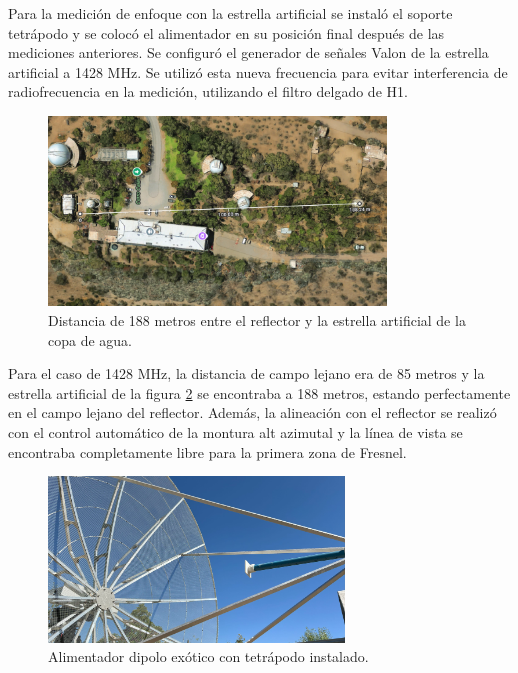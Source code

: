 Para la medición de enfoque con la estrella artificial se instaló el soporte tetrápodo y se colocó el alimentador en su posición final después de las mediciones anteriores. Se configuró el generador de señales Valon de la estrella artificial a 1428 MHz. Se utilizó esta nueva frecuencia para evitar interferencia de radiofrecuencia en la medición, utilizando el filtro delgado de H1.\\

\begin{figure}
    \centering
    \includegraphics[width=0.8\textwidth]{img/188m_measure}
    \caption{Distancia de 188 metros entre el reflector y la estrella artificial de la copa de agua.}
    \label{fig:enfoque2}
\end{figure}

Para el caso de 1428 MHz, la distancia de campo lejano era de 85 metros y la estrella artificial de la figura \ref{fig:enfoque2} se encontraba a 188 metros, estando perfectamente en el campo lejano del reflector. Además, la alineación con el reflector se realizó con el control automático de la montura alt azimutal y la línea de vista se encontraba completamente libre para la primera zona de Fresnel.\\

\begin{figure}
    \centering
    \includegraphics[width=0.7\textwidth]{img/feed_focus}
    \caption{Alimentador dipolo exótico con tetrápodo instalado.}
    \label{fig:enfoque2}
\end{figure}

